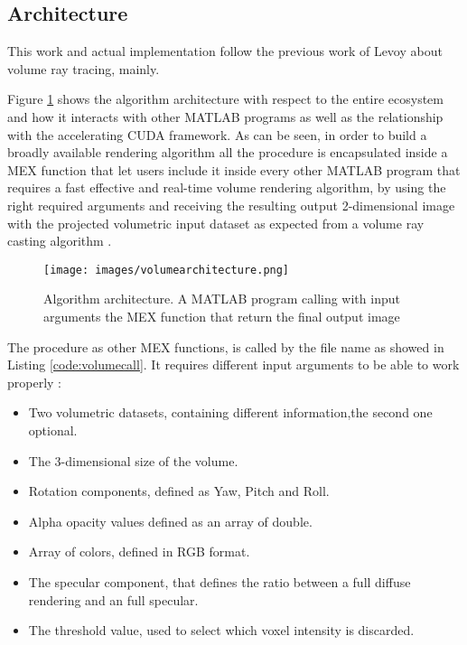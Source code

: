 \documentclass[12pt,a4paper]{extarticle}
\begin{document}


\subsection{Architecture} 

This work and actual implementation follow the previous work of Levoy about volume ray tracing, mainly.

Figure \ref{fig:architecture} shows the algorithm architecture with respect to the entire ecosystem and how it interacts with other MATLAB programs as well as the relationship with the accelerating CUDA framework. As can be seen, in order to build a broadly available rendering algorithm all the procedure is encapsulated inside a MEX function that let users include it inside every other MATLAB program that requires a fast effective and real-time volume rendering algorithm, by using the right required arguments and receiving the resulting output 2-dimensional image with the projected volumetric input dataset as expected from a volume ray casting algorithm  \cite{levoy_1988:4}.

\begin{figure}[hbtp]
\centering
\texttt{[image: images/volumearchitecture.png]}
\caption{Algorithm architecture. A MATLAB program calling with input arguments the MEX function that return the final output image}
\label{fig:architecture}
\end{figure}

The procedure as other MEX functions, is called by the file name as showed in Listing \ref{code:volumecall}. It requires different input arguments to be able to work properly :
\begin{itemize}
\item Two volumetric datasets, containing different information,the second one optional.
\item The 3-dimensional size of the volume.
\item Rotation components, defined as Yaw, Pitch and Roll.
\item Alpha opacity values defined as an array of double.
\item Array of colors, defined in RGB format.
\item The specular component, that defines the ratio between a full diffuse rendering and an full specular. 
\item The threshold value, used to select which voxel intensity is discarded.
\end{itemize}
\end{document}

